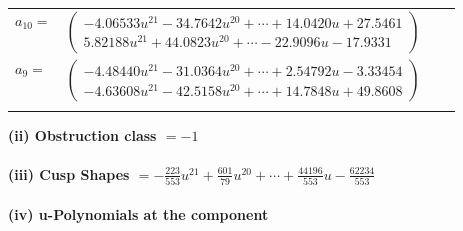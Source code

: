\documentclass[1p]{elsarticle_modified}
\theoremstyle{definition}
\begin{document}
\begin{tabular}{m{7pt} m{180pt} m{7pt} m{180pt} }
\flushright $a_{10}=$&$\begin{pmatrix}-4.06533 u^{21}-34.7642 u^{20}+\cdots+14.0420 u+27.5461\\5.82188 u^{21}+44.0823 u^{20}+\cdots-22.9096 u-17.9331\end{pmatrix}$ \\
\flushright $a_{9}=$&$\begin{pmatrix}-4.48440 u^{21}-31.0364 u^{20}+\cdots+2.54792 u-3.33454\\-4.63608 u^{21}-42.5158 u^{20}+\cdots+14.7848 u+49.8608\end{pmatrix}$\\&\end{tabular}
\flushleft \textbf{(ii) Obstruction class $= -1$}\\~\\
\flushleft \textbf{(iii) Cusp Shapes $= -\frac{223}{553} u^{21}+\frac{601}{79} u^{20}+\cdots+\frac{44196}{553} u-\frac{62234}{553}$}\\~\\
\newpage\renewcommand{\arraystretch}{1}
\flushleft \textbf{(iv) u-Polynomials at the component}\newline \\
\end{document}
